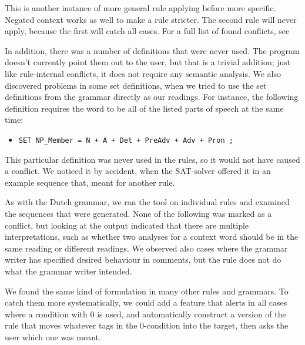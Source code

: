 This is another instance of more general rule applying before more
specific. Negated context works as well to make a rule stricter. The
second rule will never apply, because the first will catch all
cases. For a full list of found conflicts, see 

In addition, there was a number of definitions that were never
used. The program doesn't currently point them out to the user, but
that is a trivial addition; just like rule-internal conflicts, it does
not require any semantic analysis. 
We also discovered problems in some set definitions, when we tried to
use the set definitions from the grammar directly as our readings.
For instance, the following definition requires the word to be all of
the listed parts of speech at the same time:
\begin{itemize}
\item[] 
\texttt{SET NP\_Member = N + A + Det + PreAdv + Adv + Pron ;}
\end{itemize}

This particular definition was never used in the rules, so it would not
have caused a conflict. We noticed it by accident, when the SAT-solver
offered it in an example sequence that, meant for another rule.


As with the Dutch grammar, we ran the tool on individual rules and
examined the sequences that were generated. None of the following was
marked as a conflict, but looking at the output indicated that there
are multiple interpretations, such as whether two analyses for a
context word should be in the same reading or different readings.
We observed also cases where the grammar writer has specified desired
behaviour in comments, but the rule does not do what the grammar
writer intended. 

We found the same kind of formulation in many other rules and grammars.
To catch them more systematically, we could add a feature that alerts in all cases where a condition with 0 is used, and automatically construct a version of the rule that moves whatever tags in the 0-condition into the target, then asks the user which one was meant.



